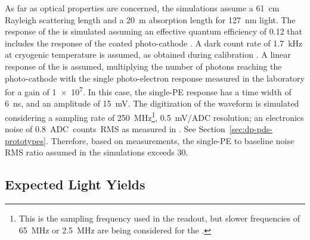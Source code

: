 As far as  optical properties are concerned, the simulations assume a \SI{61}{\cm} Rayleigh scattering length and a \SI{20}{\m} absorption length for \SI{127}{\nm} light. The response of the  is simulated assuming an effective quantum efficiency of \num{0.12} that includes the  response of the coated photo-cathode \cite{Bonesini:2018ubd}. A dark count rate of \SI{1.7}{\kilo\hertz} at cryogenic temperature is assumed, as obtained during   calibration \cite{Belver:2018erf}. A linear response of the  is assumed, multiplying the number of photons reaching the photo-cathode with the single photo-electron response measured in the laboratory for a gain of \num{1e7}. In this case, the single-PE response has a time width of \SI{6}{\nano\s}, and an amplitude of \SI{15}{mV}. The digitization of the waveform is simulated considering a sampling rate of \SI{250}{MHz}\footnote{This is the sampling frequency used in the  readout, but slower frequencies of \SI{65}{MHz} or \SI{2.5}{MHz} are being considered for the  .}, \SI{0.5}{mV/ADC} resolution; an electronics noise of \SI{0.8}{ADC counts RMS} as measured in . See Section~\ref{sec:dp-pds-prototypes}. Therefore, based on  measurements, the single-PE to baseline noise RMS  ratio assumed in the simulations exceeds \num{30}. 


\subsection{Expected Light Yields}
\label{subsec:dp-pds-simulation_yields}



